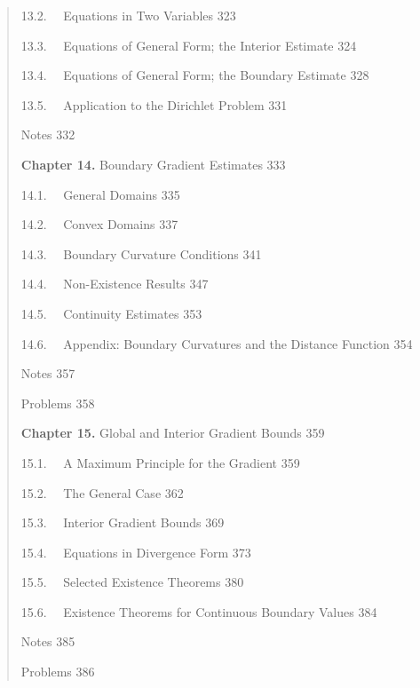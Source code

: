 \begin{quote}
\noindent \hspace*{1.5em} 13.2. \ \ Equations in Two Variables \hfill 323

\noindent \hspace*{1.5em} 13.3. \ \ Equations of General Form; the Interior Estimate \hfill 324

\noindent \hspace*{1.5em} 13.4. \ \ Equations of General Form; the Boundary Estimate \hfill 328

\noindent \hspace*{1.5em} 13.5. \ \ Application to the Dirichlet Problem \hfill 331

\noindent Notes \hfill 332

\vspace{1em}

\noindent \textbf{Chapter 14.}  Boundary Gradient Estimates \hfill 333

\noindent \hspace*{1.5em} 14.1. \ \ General Domains \hfill 335

\noindent \hspace*{1.5em} 14.2. \ \ Convex Domains \hfill 337

\noindent \hspace*{1.5em} 14.3. \ \ Boundary Curvature Conditions \hfill 341

\noindent \hspace*{1.5em} 14.4. \ \ Non-Existence Results \hfill 347

\noindent \hspace*{1.5em} 14.5. \ \ Continuity Estimates \hfill 353

\noindent \hspace*{1.5em} 14.6. \ \ Appendix: Boundary Curvatures and the Distance Function \hfill 354

\noindent Notes \hfill 357

\noindent Problems \hfill 358

\vspace{1em}

\noindent \textbf{Chapter 15.}  Global and Interior Gradient Bounds \hfill 359

\noindent \hspace*{1.5em} 15.1. \ \ A Maximum Principle for the Gradient \hfill 359

\noindent \hspace*{1.5em} 15.2. \ \ The General Case \hfill 362

\noindent \hspace*{1.5em} 15.3. \ \ Interior Gradient Bounds \hfill 369

\noindent \hspace*{1.5em} 15.4. \ \ Equations in Divergence Form \hfill 373

\noindent \hspace*{1.5em} 15.5. \ \ Selected Existence Theorems \hfill 380

\noindent \hspace*{1.5em} 15.6. \ \ Existence Theorems for Continuous Boundary Values \hfill 384

\noindent Notes \hfill 385

\noindent Problems \hfill 386
\end{quote}

